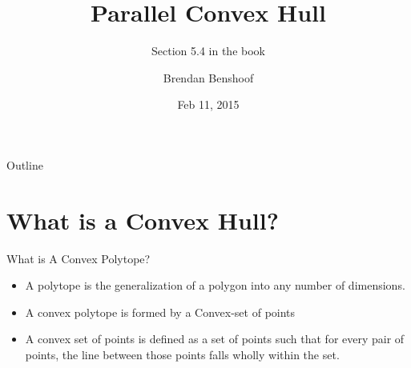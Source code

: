 \documentclass{beamer}
\title[Parallel Convex Hull] %
{Parallel Convex Hull}
\subtitle
{Section 5.4 in the book}
\author{Brendan Benshoof} %
\date %
{Feb 11, 2015}
\begin{document}
\begin{frame}
  \titlepage
\end{frame}

\begin{frame}{Outline}
  \tableofcontents
\end{frame}





\section{What is a Convex Hull?}

\begin{frame}{What is A Convex Polytope?}
  \begin{itemize}
  \item
    A polytope is the generalization of a polygon into any number of dimensions.
  \item
    A convex polytope is formed by a Convex-set of points
  \item
    A convex set of points is defined as a set of points such that for every pair of points, the line between those points falls wholly within the set.
  \end{itemize}
  
\end{frame}
\end{document}
